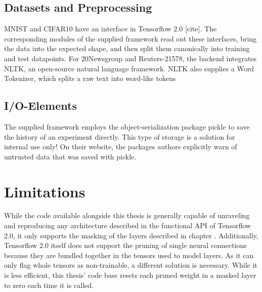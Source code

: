 \subsection{Datasets and Preprocessing}
MNIST and CIFAR10 have an interface in Tensorflow 2.0 [cite]. The corresponding modules of the supplied framework read out these interfaces, bring the data into the expected shape, and then split them canonically into training and test datapoints. 
For 20Newsgroup and Reuters-21578, the backend integrates NLTK, an open-source natural language framework. NLTK also supplies a Word Tokenizer, which splits a raw text into word-like tokens
\subsection{I/O-Elements}
The supplied framework employs the object-serialization package pickle to save the history of an experiment directly. This type of storage is a solution for internal use only! On their website, the packages authors explicitly warn of untrusted data that was saved with pickle.

\section{Limitations}
While the code available alongside this thesis is generally capable of unraveling and reproducing any architecture described in the functional API of Tensorflow 2.0, it only supports the masking of the layers described in chapter . 
Additionally, Tensorflow 2.0 itself does not support the pruning of single neural connections because they are bundled together in the tensors used to model layers. As it can only flag whole tensors as non-trainable, a different solution is necessary. While it is less efficient, this thesis' code base resets each pruned weight in a masked layer to zero each time it is called.